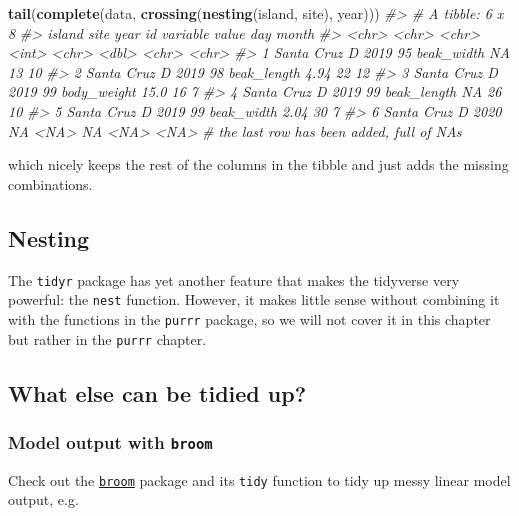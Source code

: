 \documentclass[]{book}
\newenvironment{Shaded}{}{}
\newcommand{\CommentTok}[1]{\textcolor[rgb]{0.38,0.63,0.69}{\textit{#1}}}
\newcommand{\KeywordTok}[1]{\textcolor[rgb]{0.00,0.44,0.13}{\textbf{#1}}}
\newcommand{\NormalTok}[1]{#1}
\begin{document}
\begin{Shaded}
\begin{Highlighting}[]
\KeywordTok{tail}\NormalTok{(}\KeywordTok{complete}\NormalTok{(data, }\KeywordTok{crossing}\NormalTok{(}\KeywordTok{nesting}\NormalTok{(island, site), year)))}
\CommentTok{#> # A tibble: 6 x 8}
\CommentTok{#>   island     site  year     id variable    value day   month}
\CommentTok{#>   <chr>      <chr> <chr> <int> <chr>       <dbl> <chr> <chr>}
\CommentTok{#> 1 Santa Cruz D     2019     95 beak_width  NA    13    10   }
\CommentTok{#> 2 Santa Cruz D     2019     98 beak_length  4.94 22    12   }
\CommentTok{#> 3 Santa Cruz D     2019     99 body_weight 15.0  16    7    }
\CommentTok{#> 4 Santa Cruz D     2019     99 beak_length NA    26    10   }
\CommentTok{#> 5 Santa Cruz D     2019     99 beak_width   2.04 30    7    }
\CommentTok{#> 6 Santa Cruz D     2020     NA <NA>        NA    <NA>  <NA>}
\CommentTok{# the last row has been added, full of NAs}
\end{Highlighting}
\end{Shaded}

which nicely keeps the rest of the columns in the tibble and just adds the missing combinations.

\hypertarget{nesting}{%
\subsection{Nesting}\label{nesting}}

The \texttt{tidyr} package has yet another feature that makes the tidyverse very powerful: the \texttt{nest} function. However, it makes little sense without combining it with the functions in the \texttt{purrr} package, so we will not cover it in this chapter but rather in the \texttt{purrr} chapter.

\hypertarget{what-else-can-be-tidied-up}{%
\subsection{What else can be tidied up?}\label{what-else-can-be-tidied-up}}

\hypertarget{model-output-with-broom}{%
\subsubsection{\texorpdfstring{Model output with \texttt{broom}}{Model output with broom}}\label{model-output-with-broom}}

Check out the \href{https://cran.r-project.org/web/packages/broom/vignettes/broom.html}{\texttt{broom}} package and its \texttt{tidy} function to tidy up messy linear model output, e.g.
\end{document}
